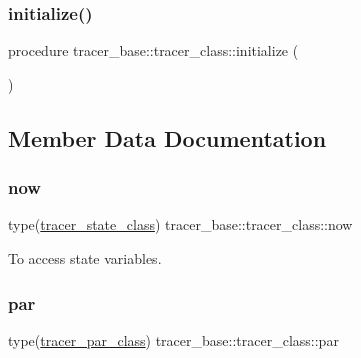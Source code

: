 \subsubsection{\texorpdfstring{initialize()}{initialize()}}
{\footnotesize\ttfamily procedure tracer\+\_\+base\+::tracer\+\_\+class\+::initialize (\begin{DoxyParamCaption}{ }\end{DoxyParamCaption})\hspace{0.3cm}{\ttfamily [private]}}



\subsection{Member Data Documentation}
\mbox{\label{structtracer__base_1_1tracer__class_aa0489335062707afec2dbbb978f0c68d}} 
\subsubsection{\texorpdfstring{now}{now}}
{\footnotesize\ttfamily type(\hyperlink{structtracer__base_1_1tracer__state__class}{tracer\+\_\+state\+\_\+class}) tracer\+\_\+base\+::tracer\+\_\+class\+::now\hspace{0.3cm}{\ttfamily [private]}}



To access state variables. 

\mbox{\label{structtracer__base_1_1tracer__class_a65acca4d35b24ec0b60eb32574004364}} 
\subsubsection{\texorpdfstring{par}{par}}
{\footnotesize\ttfamily type(\hyperlink{structtracer__base_1_1tracer__par__class}{tracer\+\_\+par\+\_\+class}) tracer\+\_\+base\+::tracer\+\_\+class\+::par\hspace{0.3cm}{\ttfamily [private]}}



